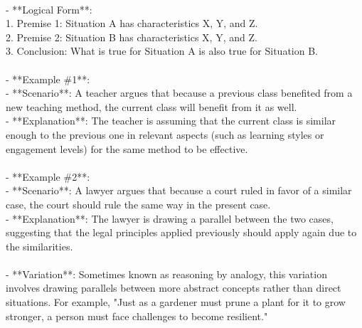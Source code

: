 \documentclass[a4paper,12pt,single,pdftex]{scrbook}
\begin{document}
    
      
    \\

    
      - **Logical Form**:
    \\

    
        1. Premise 1: Situation A has characteristics X, Y, and Z.
    \\

    
        2. Premise 2: Situation B has characteristics X, Y, and Z.
    \\

    
        3. Conclusion: What is true for Situation A is also true for Situation B.
    \\

    
      
    \\

    
      - **Example \#1**:
    \\

    
        - **Scenario**: A teacher argues that because a previous class benefited from a new teaching method, the current class will benefit from it as well.
    \\

    
        - **Explanation**: The teacher is assuming that the current class is similar enough to the previous one in relevant aspects (such as learning styles or engagement levels) for the same method to be effective.
    \\

    
      
    \\

    
      - **Example \#2**:
    \\

    
        - **Scenario**: A lawyer argues that because a court ruled in favor of a similar case, the court should rule the same way in the present case.
    \\

    
        - **Explanation**: The lawyer is drawing a parallel between the two cases, suggesting that the legal principles applied previously should apply again due to the similarities.
    \\

    
      
    \\

    
      - **Variation**: Sometimes known as reasoning by analogy, this variation involves drawing parallels between more abstract concepts rather than direct situations. For example, "Just as a gardener must prune a plant for it to grow stronger, a person must face challenges to become resilient."
    \\
\end{document}
